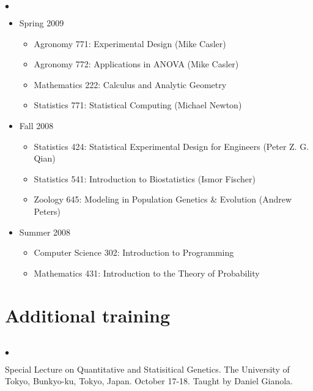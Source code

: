 \documentclass[margin,line,10pt]{res}
\newenvironment{list2}{
  \begin{list}{$\bullet$}{%
      \setlength{\itemsep}{0in}
      \setlength{\parsep}{0in} \setlength{\parskip}{0in}
      \setlength{\topsep}{0in} \setlength{\partopsep}{0in} 
      \setlength{\leftmargin}{0.2in}}}{\end{list}}
\begin{document}
\begin{resume}
\begin{list2}
\begin{itemize}
\item Spring 2009
\begin{itemize}
\item Agronomy 771: Experimental Design (Mike Casler)
\item Agronomy 772: Applications in ANOVA (Mike Casler)
\item Mathematics 222: Calculus and Analytic Geometry
\item Statistics 771: Statistical Computing (Michael Newton)
\end{itemize}


\item Fall 2008
\begin{itemize}
\item Statistics 424: Statistical Experimental Design for Engineers (Peter Z. G. Qian)
\item Statistics 541: Introduction to Biostatistics (Ismor Fischer)
\item Zoology 645: Modeling in Population Genetics \& Evolution (Andrew Peters)
\end{itemize}

\item Summer 2008
\begin{itemize}
\item Computer Science 302: Introduction to Programming
\item Mathematics 431: Introduction to the Theory of Probability
\end{itemize}

\end{itemize}
\end{list2}



\vspace{0.5cm}
\section{ \sc Additional training}
\vspace{1cm}

\section{}
\begin{list2}

\item Special Lecture on Quantitative and Statisitical Genetics. The University of Tokyo, Bunkyo-ku, Tokyo, Japan. October 17-18. Taught by Daniel Gianola.


\end{list2}
\end{resume}
\end{document}
